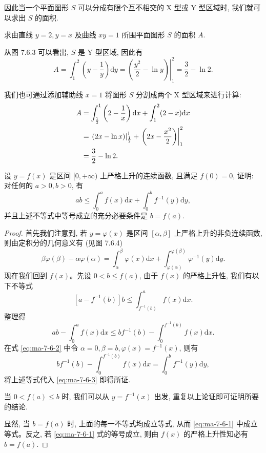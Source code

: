 因此当一个平面图形 $S$ 可以分成有限个互不相交的 X 型或 Y 型区域时, 我们就可以求出 $S$ 的面积.

\begin{example}\label{example:ma-7-6-1}
求由直线 $y=2,y=x$ 及曲线 $xy=1$ 所围平面图形 $S$ 的面积 $A$.
\end{example}


\begin{solve}
从图 7.6.3 可以看出, $S$ 是 Y 型区域, 因此有
\[
  A=\int_1^2\left(y-\frac{1}{y}\right)\mathrm dy
  =\left.\left(\frac{y^2}{2}-\ln y\right)\right|_1^2
  =\frac{3}{2}-\ln2.
\]

我们也可通过添加辅助线 $x=1$ 将图形 $S$ 分割成两个 X 型区域来进行计算:
\[
\begin{aligned}
  A&=\int_{\frac12}^1\left(2-\frac{1}{x}\right)\mathrm dx+\int_1^2(2-x)\mathrm dx\\
  &=\left.(2x-\ln x)\right|_{\frac12}^1
  +\left.\left(2x-\frac{x^2}{2}\right)\right|_1^2\\
  &=\frac{3}{2}-\ln2.
\end{aligned}
\qedhere
\]
\end{solve}


\begin{example}\label{example:ma-7-6-2}
设 $y=f(x)$ 是区间 $[0,+\infty)$ 上严格上升的连续函数, 且满足 $f(0)=0$, 证明: 对任何的 $a>0,b>0$, 有
\begin{equation}
  ab\leq\int_0^a f(x)\mathrm dx+\int_0^b f^{-1}(y)\mathrm dy,
  \label{eq:ma-7-6-1}
\end{equation}
并且上述不等式中等号成立的充分必要条件是 $b=f(a)$.
\end{example}


\begin{proof}
首先我们注意到, 若 $y=\varphi(x)$ 是区间 $[\alpha,\beta]$ 上严格上升的非负连续函数, 则由定积分的几何意义有 (见图 7.6.4)
\begin{equation}
  \beta\varphi(\beta)-\alpha\varphi(\alpha)
  =\int_\alpha^\beta \varphi(x)\mathrm dx
  +\int_{\varphi(\alpha)}^{\varphi(\beta)}\varphi^{-1}(y)\mathrm dy.
  \label{eq:ma-7-6-2}
\end{equation}
现在我们回到 $f(x)$。先设 $0<b\leq f(a)$, 由于 $f(x)$ 的严格上升性, 我们有以下不等式
\[
  [a-f^{-1}(b)]b\leq\int_{f^{-1}(b)}^a f(x)\mathrm dx.
\]
整理得
\begin{equation}
  ab-\int_0^a f(x)\mathrm dx
  \leq bf^{-1}(b)-\int_0^{f^{-1}(b)}f(x)\mathrm dx.
  \label{eq:ma-7-6-3}
\end{equation}
在式 \eqref{eq:ma-7-6-2} 中令 $\alpha=0,\beta=b,\varphi(x)=f^{-1}(x)$, 则有
\[
  bf^{-1}(b)-\int_0^{f^{-1}(b)}f(x)\mathrm dx
  =\int_0^b f^{-1}(y)\mathrm dy,
\]
将上述等式代入 \eqref{eq:ma-7-6-3} 即得所证.

当 $0<f(a)\leq b$ 时, 我们可以从 $y=f^{-1}(x)$ 出发, 重复以上论证即可证明所要的结论.

显然, 当 $b=f(a)$ 时, 上面的每一不等式均成立等式, 从而 \eqref{eq:ma-7-6-1} 中成立等式。反之, 若 \eqref{eq:ma-7-6-1} 式的等号成立, 则由 $f(x)$ 的严格上升性知必有 $b=f(a)$.
\end{proof}


